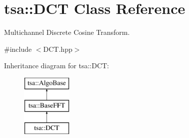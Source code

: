 \hypertarget{classtsa_1_1_d_c_t}{}\section{tsa\+:\+:D\+CT Class Reference}
\label{classtsa_1_1_d_c_t}


Multichannel Discrete Cosine Transform.  




{\ttfamily \#include $<$D\+C\+T.\+hpp$>$}

Inheritance diagram for tsa\+:\+:D\+CT\+:\begin{figure}[H]
\begin{center}
\leavevmode
\includegraphics[height=3.000000cm]{classtsa_1_1_d_c_t}
\end{center}
\end{figure}
